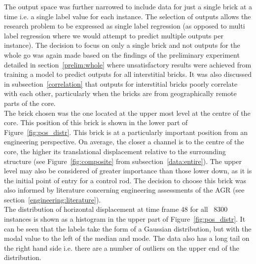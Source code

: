 \noindent
The output space was further narrowed to include data for just a single brick at a time i.e. a single label value for each instance. The selection of outputs allows the research problem to be expressed as single label regression (as opposed to multi label regression where we would attempt to predict multiple outputs per instance). The decision to focus on only a single brick and not outputs for the whole go was again made based on the findings of the preliminary experiment detailed in section~\ref{prelim:whole} where unsatisfactory results were achieved from training a model to predict outputs for all interstitial bricks. It was also discussed in subsection~\ref{correlation} that outputs for interstitial bricks poorly correlate with each other, particularly when the bricks are from geographically remote parts of the core.
\\

\noindent
The brick chosen was the one located at the upper most level at the centre of the core. This position of this brick is shown in the lower part of Figure~\ref{fig:pos_distr}. This brick is at a particularly important position from an engineering perspective. On average, the closer a channel is to the centre of the core, the higher its translational displacement relative to the surrounding structure (see Figure~\ref{fig:composite} from subsection~\ref{data:entire}). The upper level may also be considered of greater importance than those lower down, as it is the initial point of entry for a control rod. The decision to choose this brick was also informed by literature concerning engineering assessments of the AGR (see section~\ref{engineering:literature}).
\\

\noindent
The distribution of horizontal displacement at time frame 48 for all ~8300 instances is shown as a histogram in the upper part of Figure~\ref{fig:pos_distr}. It can be seen that the labels take the form of a Gaussian distribution, but with the modal value to the left of the median and mode. The data also has a long tail on the right hand side i.e. there are a number of outliers on the upper end of the distribution.

